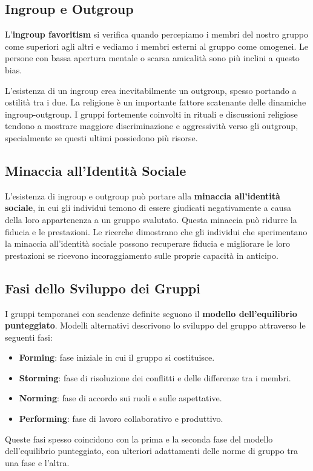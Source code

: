 \documentclass{article}
\begin{document}
\subsection{Ingroup e Outgroup}

L’\textbf{ingroup favoritism} si verifica quando percepiamo i membri del nostro gruppo come superiori agli altri e vediamo i membri esterni al gruppo come omogenei. Le persone con bassa apertura mentale o scarsa amicalità sono più inclini a questo bias.

L'esistenza di un ingroup crea inevitabilmente un outgroup, spesso portando a ostilità tra i due. La religione è un importante fattore scatenante delle dinamiche ingroup-outgroup. I gruppi fortemente coinvolti in rituali e discussioni religiose tendono a mostrare maggiore discriminazione e aggressività verso gli outgroup, specialmente se questi ultimi possiedono più risorse.


\subsection{Minaccia all'Identità Sociale}

L'esistenza di ingroup e outgroup può portare alla \textbf{minaccia all'identità sociale}, in cui gli individui temono di essere giudicati negativamente a causa della loro appartenenza a un gruppo svalutato. Questa minaccia può ridurre la fiducia e le prestazioni. Le ricerche dimostrano che gli individui che sperimentano la minaccia all'identità sociale possono recuperare fiducia e migliorare le loro prestazioni se ricevono incoraggiamento sulle proprie capacità in anticipo.

\subsection{Fasi dello Sviluppo dei Gruppi}

I gruppi temporanei con scadenze definite seguono il \textbf{modello dell'equilibrio punteggiato}. Modelli alternativi descrivono lo sviluppo del gruppo attraverso le seguenti fasi:
\begin{itemize}
    \item \textbf{Forming}: fase iniziale in cui il gruppo si costituisce.
    \item \textbf{Storming}: fase di risoluzione dei conflitti e delle differenze tra i membri.
    \item \textbf{Norming}: fase di accordo sui ruoli e sulle aspettative.
    \item \textbf{Performing}: fase di lavoro collaborativo e produttivo.
\end{itemize}
Queste fasi spesso coincidono con la prima e la seconda fase del modello dell'equilibrio punteggiato, con ulteriori adattamenti delle norme di gruppo tra una fase e l'altra.
\end{document}
